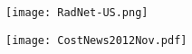 \documentclass{beamer}
\begin{document}
\begin{frame}
	\begin{center}
		\texttt{[image: RadNet-US.png]}
	\end{center}
	\let\thefootnote\relax{}
\end{frame}

\begin{frame}
	\centering
	\texttt{[image: CostNews2012Nov.pdf]}
\end{frame}

\end{document}
